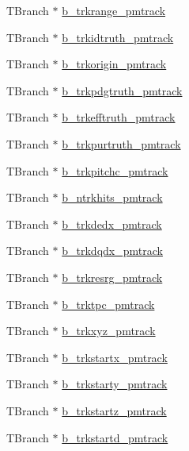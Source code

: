 \begin{DoxyCompactItemize}
\item 
T\-Branch $\ast$ \hyperlink{classanatree_ae0d52d406a991b37a57c790471446a65}{b\-\_\-trkrange\-\_\-pmtrack}
\item 
T\-Branch $\ast$ \hyperlink{classanatree_a4604605c7bbdc556d44563ca0919dd9a}{b\-\_\-trkidtruth\-\_\-pmtrack}
\item 
T\-Branch $\ast$ \hyperlink{classanatree_a911c9395d91673d18593a99365d3c2c2}{b\-\_\-trkorigin\-\_\-pmtrack}
\item 
T\-Branch $\ast$ \hyperlink{classanatree_a7f6fe6ec9370774fcf0342c2939c10c0}{b\-\_\-trkpdgtruth\-\_\-pmtrack}
\item 
T\-Branch $\ast$ \hyperlink{classanatree_a108fe48335adb824b5d865f6c6edba3a}{b\-\_\-trkefftruth\-\_\-pmtrack}
\item 
T\-Branch $\ast$ \hyperlink{classanatree_a91198758c18ed18f94592df4d7fbfe92}{b\-\_\-trkpurtruth\-\_\-pmtrack}
\item 
T\-Branch $\ast$ \hyperlink{classanatree_a033271b448b4fa957039e353e6bec94e}{b\-\_\-trkpitchc\-\_\-pmtrack}
\item 
T\-Branch $\ast$ \hyperlink{classanatree_aeb9c12f33af0fa99e2faa6c95159e5b0}{b\-\_\-ntrkhits\-\_\-pmtrack}
\item 
T\-Branch $\ast$ \hyperlink{classanatree_a4adf161c4f3d1b6cec0b1079c9c1c2f3}{b\-\_\-trkdedx\-\_\-pmtrack}
\item 
T\-Branch $\ast$ \hyperlink{classanatree_a2167299195a8fb353cef9317eb7c906f}{b\-\_\-trkdqdx\-\_\-pmtrack}
\item 
T\-Branch $\ast$ \hyperlink{classanatree_a04e1dfa2edc89aa709d0590e4972a0f4}{b\-\_\-trkresrg\-\_\-pmtrack}
\item 
T\-Branch $\ast$ \hyperlink{classanatree_a97716e216669415dde8244d2f83ef5d1}{b\-\_\-trktpc\-\_\-pmtrack}
\item 
T\-Branch $\ast$ \hyperlink{classanatree_add9fa6b08ec7c82a607874df0213c0f3}{b\-\_\-trkxyz\-\_\-pmtrack}
\item 
T\-Branch $\ast$ \hyperlink{classanatree_a3b8f32fcce6093b6a82ea3a8748bca54}{b\-\_\-trkstartx\-\_\-pmtrack}
\item 
T\-Branch $\ast$ \hyperlink{classanatree_a6226fc0736403da9aadece560924558b}{b\-\_\-trkstarty\-\_\-pmtrack}
\item 
T\-Branch $\ast$ \hyperlink{classanatree_a7f7d7969b71f67616244c35371bd7479}{b\-\_\-trkstartz\-\_\-pmtrack}
\item 
T\-Branch $\ast$ \hyperlink{classanatree_a3a1a6ec73c344b941019367ecb89e108}{b\-\_\-trkstartd\-\_\-pmtrack}

\end{DoxyCompactItemize}
